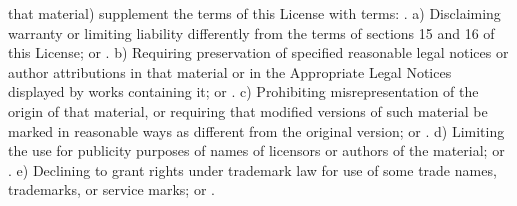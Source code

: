 \begin{script}
 that material) supplement the terms of this License with terms:
 .
     a) Disclaiming warranty or limiting liability differently from the
     terms of sections 15 and 16 of this License; or
 .
     b) Requiring preservation of specified reasonable legal notices or
     author attributions in that material or in the Appropriate Legal
     Notices displayed by works containing it; or
 .
     c) Prohibiting misrepresentation of the origin of that material, or
     requiring that modified versions of such material be marked in
     reasonable ways as different from the original version; or
 .
     d) Limiting the use for publicity purposes of names of licensors or
     authors of the material; or
 .
     e) Declining to grant rights under trademark law for use of some
     trade names, trademarks, or service marks; or
 .
\end{script}

